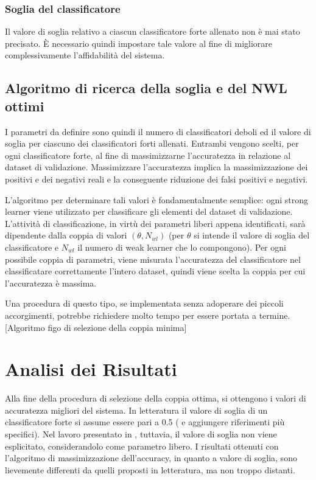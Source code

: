             \subsubsection{Soglia del classificatore}
                Il valore di soglia relativo a ciascun classificatore forte allenato non è mai stato precisato.
                È necessario quindi impostare tale valore al fine di migliorare complessivamente l'affidabilità del sistema.

        \subsection{Algoritmo di ricerca della soglia e del NWL ottimi}
            I parametri da definire sono quindi il numero di classificatori deboli ed il valore di soglia per ciascuno dei classificatori forti allenati.
            Entrambi vengono scelti, per ogni classificatore forte, al fine di massimizzarne l'accuratezza in relazione al dataset di validazione.
            Massimizzare l'accuratezza implica la massimizzazione dei positivi e dei negativi reali e la conseguente riduzione dei falsi positivi e negativi.

            L'algoritmo per determinare tali valori è fondamentalmente semplice: ogni strong learner viene utilizzato per classificare gli elementi del dataset di validazione.
            L'attività di classificazione, in virtù dei parametri liberi appena identificati, sarà dipendente dalla coppia di valori $(\theta, N_{wl})$ (per $\theta$ si intende il valore di soglia del classificatore e $N_{wl}$ il numero di weak learner che lo compongono).
            Per ogni possibile coppia di parametri, viene misurata l'accuratezza del classificatore nel classificatare correttamente l'intero dataset, quindi viene scelta la coppia per cui l'accuratezza è massima.

            Una procedura di questo tipo, se implementata senza adoperare dei piccoli accorgimenti, potrebbe richiedere molto tempo per essere portata a termine.
            [Algoritmo figo di selezione della coppia minima]

    \section{Analisi dei Risultati} %
    \label{sec:analisi_dei_risultati}
        Alla fine della procedura di selezione della coppia ottima, si ottengono i valori di accuratezza migliori del sistema.
            In letteratura il valore di soglia di un classificatore forte si assume essere pari a 0.5 (\cite{Freund97} e \cite{Viola04} aggiungere riferimenti più specifici). Nel lavoro presentato in \cite{Zhu13}, tuttavia, il valore di soglia non viene esplicitato, considerandolo come parametro libero.
            I risultati ottenuti con l'algoritmo di massimizzazione dell'accuracy, in quanto a valore di soglia, sono lievemente differenti da quelli proposti in letteratura, ma non troppo distanti.

